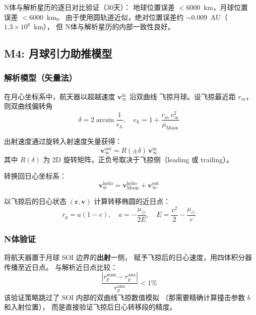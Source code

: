 \documentclass[a4paper,12pt]{article}
\begin{document}
N体与解析星历的逐日对比验证（30天）：
地球位置误差 $< 6000$~km，月球位置误差 $< 6000$~km。
由于使用圆轨道近似，绝对位置误差约 $\sim 0.009$~AU（$1.3 \times 10^6$~km），
但 N体与解析星历的内部一致性良好。

\subsection{M4: 月球引力助推模型}\label{sec:m4}

\subsubsection{解析模型（矢量法）}

在月心坐标系中，航天器以超越速度 $\mathbf{v}_\infty^{\mathrm{in}}$ 沿双曲线
飞掠月球。设飞掠最近距 $r_m$，则双曲线偏转角
\begin{equation}\label{eq:turn}
  \delta = 2\arcsin\frac{1}{e_h}, \quad
  e_h = 1 + \frac{r_m \, v_\infty^2}{\mu_{\mathrm{Moon}}}
\end{equation}

出射速度通过旋转入射速度矢量获得：
\begin{equation}
  \mathbf{v}_\infty^{\mathrm{out}} = R(\pm\delta) \, \mathbf{v}_\infty^{\mathrm{in}}
\end{equation}
其中 $R(\delta)$ 为 2D 旋转矩阵，正负号取决于飞掠侧（leading 或 trailing）。

转换回日心坐标系：
\begin{equation}
  \mathbf{v}_{\mathrm{sc}}^{\mathrm{helio}} = \mathbf{v}_{\mathrm{Moon}}^{\mathrm{helio}}
  + \mathbf{v}_\infty^{\mathrm{out}}
\end{equation}

以飞掠后的日心状态 $(\mathbf{r}, \mathbf{v})$ 计算转移椭圆的近日点：
\begin{equation}
  r_p = a(1-e), \quad a = -\frac{\mu_\odot}{2E}, \quad
  E = \frac{v^2}{2} - \frac{\mu_\odot}{r}
\end{equation}

\subsubsection{N体验证}

将航天器置于月球 SOI 边界的\textbf{出射}一侧，
赋予飞掠后的日心速度，用四体积分器传播至近日点。
与解析近日点比较：
\begin{equation}
  \frac{|r_p^{\mathrm{num}} - r_p^{\mathrm{ana}}|}{r_p^{\mathrm{ana}}} < 1\%
\end{equation}
该验证策略跳过了 SOI 内部的双曲线飞掠数值模拟
（那需要精确计算撞击参数 $b$ 和入射位置），
而是直接验证飞掠后日心转移段的精度。
\end{document}
